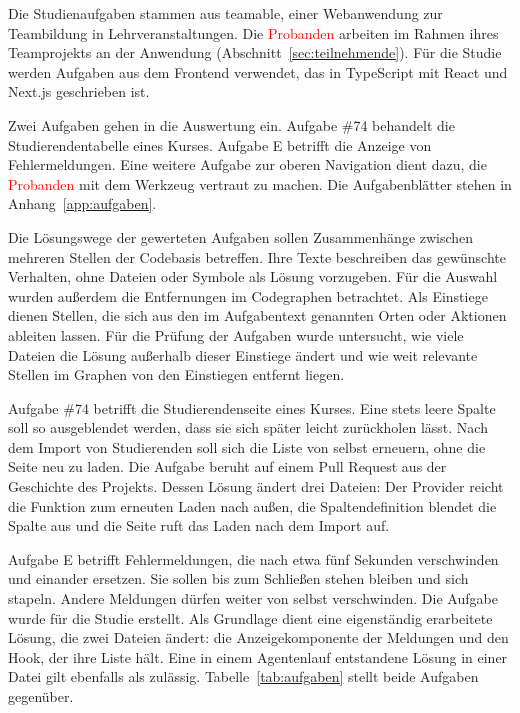 Die Studienaufgaben stammen aus teamable, einer Webanwendung zur Teambildung in Lehrveranstaltungen. Die \textcolor{red}{Probanden} arbeiten im Rahmen ihres Teamprojekts an der Anwendung (Abschnitt~\ref{sec:teilnehmende}). Für die Studie werden Aufgaben aus dem Frontend verwendet, das in TypeScript mit React und Next.js geschrieben ist.

Zwei Aufgaben gehen in die Auswertung ein. Aufgabe \#74 behandelt die Studierendentabelle eines Kurses. Aufgabe E betrifft die Anzeige von Fehlermeldungen. Eine weitere Aufgabe zur oberen Navigation dient dazu, die \textcolor{red}{Probanden} mit dem Werkzeug vertraut zu machen. Die Aufgabenblätter stehen in Anhang~\ref{app:aufgaben}.


Die Lösungswege der gewerteten Aufgaben sollen Zusammenhänge zwischen mehreren Stellen der Codebasis betreffen. Ihre Texte beschreiben das gewünschte Verhalten, ohne Dateien oder Symbole als Lösung vorzugeben. Für die Auswahl wurden außerdem die Entfernungen im Codegraphen betrachtet. Als Einstiege dienen Stellen, die sich aus den im Aufgabentext genannten Orten oder Aktionen ableiten lassen. Für die Prüfung der Aufgaben wurde untersucht, wie viele Dateien die Lösung außerhalb dieser Einstiege ändert und wie weit relevante Stellen im Graphen von den Einstiegen entfernt liegen.

Aufgabe \#74 betrifft die Studierendenseite eines Kurses. Eine stets leere Spalte soll so ausgeblendet werden, dass sie sich später leicht zurückholen lässt. Nach dem Import von Studierenden soll sich die Liste von selbst erneuern, ohne die Seite neu zu laden. Die Aufgabe beruht auf einem Pull Request aus der Geschichte des Projekts. Dessen Lösung ändert drei Dateien: Der Provider reicht die Funktion zum erneuten Laden nach außen, die Spaltendefinition blendet die Spalte aus und die Seite ruft das Laden nach dem Import auf.

Aufgabe E betrifft Fehlermeldungen, die nach etwa fünf Sekunden verschwinden und einander ersetzen. Sie sollen bis zum Schließen stehen bleiben und sich stapeln. Andere Meldungen dürfen weiter von selbst verschwinden. Die Aufgabe wurde für die Studie erstellt. Als Grundlage dient eine eigenständig erarbeitete Lösung, die zwei Dateien ändert: die Anzeigekomponente der Meldungen und den Hook, der ihre Liste hält. Eine in einem Agentenlauf entstandene Lösung in einer Datei gilt ebenfalls als zulässig. Tabelle~\ref{tab:aufgaben} stellt beide Aufgaben gegenüber.


